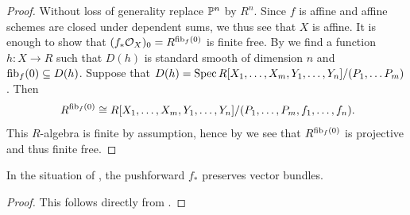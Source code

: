 \begin{proof}
  Without loss of generality replace $\mathbb{P}^n$ by $R^n$.
  Since $f$ is affine and affine schemes are closed under dependent sums, we thus see that $X$ is affine.
  It is enough to show that $(f_\ast\mathcal{O}_X)_0 = R^{\mathrm{fib}_f(0)}$ is finite free.
  By  we find a function $h : X \to R$ such that $D(h)$ is standard smooth of dimension $n$ and $\mathrm{fib}_f(0) \subseteq D(h)$.
  Suppose that $D(h) = \operatorname{Spec} R[X_1,\hdots, X_m, Y_1, \hdots, Y_n]/(P_1, \hdots P_m)$.
  Then
  \[
    R^{\fib_f(0)} \cong R[X_1, \hdots, X_m, Y_1, \hdots, Y_n]/(P_1, \hdots, P_m, f_1, \hdots, f_n) \rlap{.}
  \]
  This $R$-algebra is finite by assumption, hence by  we see that $R^{\mathrm{fib}_f(0)}$ is projective and thus finite free.
\end{proof}

\begin{corollary}
  \label{finite-map-of-equidimensional-smooth-schemes-preserves-vectorbundles}
  In the situation of , the pushforward $f_\ast$ preserves vector bundles.
\end{corollary}

\begin{proof}
  This follows directly from .
\end{proof}

